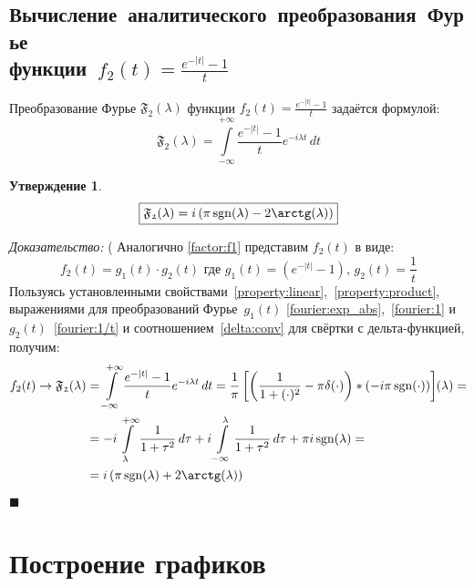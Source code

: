 \documentclass[11pt, oneside, draft]{article}
\numberwithin{equation}{section}
\newtheorem*{statement}{Утверждение}
\renewenvironment{proof}{
\noindent\textit{Доказательство: }} {\qed}
\newcommand \rarrow{\rightarrow}
\newcommand \intinf[1][{\,dt}]{ \int\limits_{-\infty}^{+\infty}{{#1}}}
\renewcommand \qed{$\blacksquare$}
\DeclareMathOperator{\sgn}{sgn}
\begin{document}
    \subsection{Вычисление~аналитического~преобразования~Фурье\\функции~\(f_2(t) = \frac{e^{-|t|} - 1}{t} \)}
    Преобразование Фурье \( \mathfrak{F_2} (\lambda)\) функции \(f_2(t) = \frac{e^{-|t|} - 1}{t} \) задаётся формулой:
    \[ \mathfrak{F_2} (\lambda) = \intinf[{\dfrac{e^{-|t|} - 1}{t} e^{-i\lambda t}\, dt}] \]
    \begin{statement}
        \begin{equation}\label{eq:fourier:f2} 
            \boxed{ \mathfrak{F_2}(\lambda) = i\left(\pi\sgn(\lambda) - 2\arctg(\lambda)\right) } 
        \end{equation}
    \end{statement}
    \begin{proof}(
        Аналогично \eqref{factor:f1} представим \(f_2(t) \) в виде: 
        \begin{equation}\label{factor:f2} 
            f_2(t) = g_1(t) \cdot g_2(t) \text{ где } g_1(t) = \left(e^{-|t|} - 1\right)\text{, } g_2(t) = \dfrac{1}{t} 
        \end{equation}
        Пользуясь установленными свойствами~\ref{property:linear},~\ref{property:product}, выражениями для преобразований Фурье~\(g_1(t)\) \eqref{fourier:exp_abs},~\eqref{fourier:1} и~\(g_2(t)\)~\eqref{fourier:1/t} и соотношением~\eqref{delta:conv} для свёртки с дельта-функцией, получим:
        \[ 
        \begin{split} 
            f_2(t) \rarrow \mathfrak{F_2} (\lambda) &= \intinf[{ \dfrac{e^{-|t|} - 1}{t} e^{-i\lambda t}\, dt}] = \dfrac{1}{\pi}\left[\left({\dfrac{1}{1 + (\cdot)^2} - \pi\delta(\cdot)}\right) * \left({-i \pi \sgn(\cdot)}\right)\right] \negmedspace({\lambda}) = \\
            &= -i\int\limits_{\lambda}^{+\infty}{\dfrac{1}{1 + \tau^2}\, d\tau} + i\int\limits_{-\infty}^{\lambda}{\dfrac{1}{1 + \tau^2}\, d\tau} + \pi i \sgn(\lambda) = \\
            &= i\left(\pi \sgn(\lambda) + 2\arctg(\lambda)\right) 
        \end{split}
        \]
    \end{proof}
    \clearpage
    \section{Построение графиков} %
    \label{sec:plotting}
\end{document}

